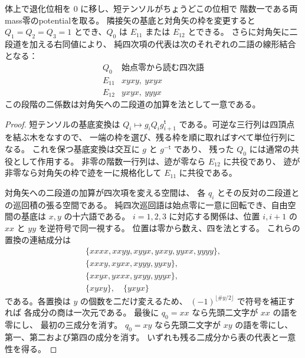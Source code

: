 \begin{proposition}[一退化位相の純四次項の二変数表示]
\label{prop:qa-avatar-one-degenerate-quartic-normal}
体上で退化位相を $0$ に移し、短テンソルがちょうどこの位相で
階数一である両mass零のpotentialを取る。
隣接矢の基底と対角矢の枠を変更すると
$Q_1=Q_2=Q_3=1$ とでき、$Q_0$ は
$E_{11}$ または $E_{12}$ とできる。
さらに対角矢に二段道を加える右同値により、
純四次項の代表は次のそれぞれの二語の線形結合となる：
\[
 \begin{array}{c|c}
 Q_0 & \text{始点零から読む四次語}\\\hline
 E_{11} & xyxy,\ yxyx\\
 E_{12} & yxyx,\ yyyx
 \end{array}
\]
この段階の二係数は対角矢への二段道の加算を法として一意である。
\end{proposition}
\begin{proof}
短テンソルの基底変換は $Q_i\mapsto g_iQ_i g_{i+1}^{\mathsf t}$
である。可逆な三行列は四頂点を結ぶ木をなすので、
一端の枠を選び、残る枠を順に取ればすべて単位行列になる。
これを保つ基底変換は交互に $g$ と $g^{-\mathsf t}$ であり、
残った $Q_0$ には通常の共役として作用する。
非零の階数一行列は、迹が零なら $E_{12}$ に共役であり、
迹が非零なら対角矢の枠で迹を一に規格化して
$E_{11}$ に共役である。

対角矢への二段道の加算が四次項を変える空間は、
各 $q_i$ とその反対の二段道との巡回積の張る空間である。
純四次巡回語は始点零に一意に回転でき、自由空間の基底は
$x,y$ の十六語である。
$i=1,2,3$ に対応する関係は、位置 $i,i+1$ の
$xx$ と $yy$ を逆符号で同一視する。
位置は零から数え、四を法とする。
これらの置換の連結成分は
\[
 \begin{gathered}
 \{xxxx,xxyy,xyyx,yxxy,yyxx,yyyy\},\\
 \{xxxy,xyxx,xyyy,yyxy\},\\
 \{xxyx,yxxx,yxyy,yyyx\},\\
 \{xyxy\},\quad\{yxyx\}
 \end{gathered}
\]
である。各置換は $y$ の個数を二だけ変えるため、
$(-1)^{\lfloor\#y/2\rfloor}$ で符号を補正すれば
各成分の商は一次元である。
最後に $q_0=xx$ なら先頭二文字が $xx$ の語を零にし、
最初の三成分を消す。
$q_0=xy$ なら先頭二文字が $xy$ の語を零にし、
第一、第二および第四の成分を消す。
いずれも残る二成分から表の代表と一意性を得る。
\end{proof}

